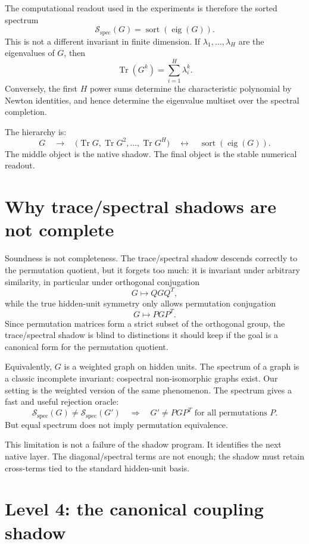 \documentclass[11pt]{article}
\newcommand{\Tr}{\operatorname{Tr}}
\newcommand{\eig}{\operatorname{eig}}
\newcommand{\Spec}{\mathcal{S}_{\mathrm{spec}}}
\begin{document}
The computational readout used in the experiments is therefore the sorted spectrum
\begin{equation}
  \Spec(G)=\operatorname{sort}(\eig(G)).
  \label{eq:spectral-shadow}
\end{equation}
This is not a different invariant in finite dimension. If $\lambda_1,\ldots,\lambda_H$ are the eigenvalues of $G$, then
\[
\Tr(G^k)=\sum_{i=1}^H\lambda_i^k.
\]
Conversely, the first $H$ power sums determine the characteristic polynomial by Newton identities, and hence determine the eigenvalue multiset over the spectral completion.

The hierarchy is:
\[
G\quad\longrightarrow\quad \bigl(\Tr G,\Tr G^2,\ldots,\Tr G^H\bigr)\quad\longleftrightarrow\quad \operatorname{sort}(\eig(G)).
\]
The middle object is the native shadow. The final object is the stable numerical readout.

\section{Why trace/spectral shadows are not complete}

Soundness is not completeness. The trace/spectral shadow descends correctly to the permutation quotient, but it forgets too much: it is invariant under arbitrary similarity, in particular under orthogonal conjugation
\[
G\mapsto QGQ^T,
\]
while the true hidden-unit symmetry only allows permutation conjugation
\[
G\mapsto PGP^T.
\]
Since permutation matrices form a strict subset of the orthogonal group, the trace/spectral shadow is blind to distinctions it should keep if the goal is a canonical form for the permutation quotient.

Equivalently, $G$ is a weighted graph on hidden units. The spectrum of a graph is a classic incomplete invariant: cospectral non-isomorphic graphs exist. Our setting is the weighted version of the same phenomenon. The spectrum gives a fast and useful rejection oracle:
\[
\Spec(G)\neq\Spec(G')\quad\Longrightarrow\quad G'\neq PGP^T\text{ for all permutations }P.
\]
But equal spectrum does not imply permutation equivalence.

This limitation is not a failure of the shadow program. It identifies the next native layer. The diagonal/spectral terms are not enough; the shadow must retain cross-terms tied to the standard hidden-unit basis.

\section{Level 4: the canonical coupling shadow}
\end{document}
